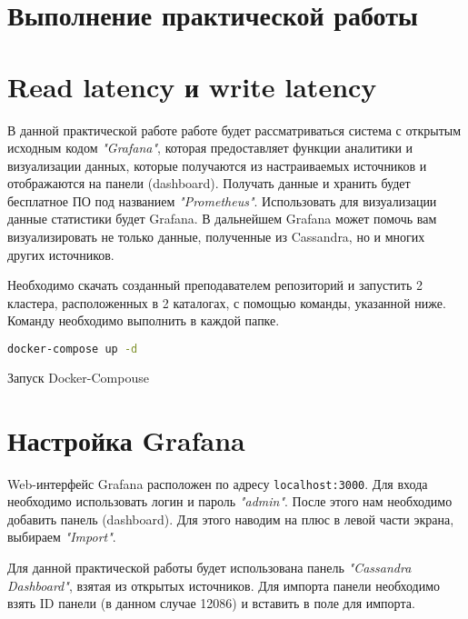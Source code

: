 \section*{\LARGE Выполнение практической работы}

\section{Read latency и write latency}

В данной практической работе работе будет рассматриваться система с
открытым исходным кодом \textit{"Grafana"}, которая предоставляет функции
аналитики и визуализации данных, которые получаются из настраиваемых
источников и отображаются на панели (dashboard). Получать данные и хранить
будет бесплатное ПО под названием \textit{"Prometheus"}. Использовать для
визуализации данные статистики будет Grafana. В дальнейшем Grafana может
помочь вам визуализировать не только данные, полученные из Cassandra, но и
многих других источников.\par
Необходимо скачать созданный преподавателем репозиторий
и запустить 2 кластера, расположенных в 2 каталогах, с
помощью команды, указанной ниже. Команду необходимо выполнить в каждой
папке.

\begin{lstlisting}[language=bash]
docker-compose up -d
\end{lstlisting}

\begin{image}
	\caption{Запуск Docker-Compouse}
	\label{fig:docker:compouse}
\end{image}

\section{Настройка Grafana}

Web-интерфейс Grafana расположен по адресу \texttt{localhost:3000}.
Для входа необходимо использовать логин и пароль \textit{"admin"}.
После этого нам необходимо добавить панель (dashboard).
Для этого наводим на плюс в левой части экрана, выбираем \textit{"Import"}.\par
Для данной практической работы будет использована панель
\textit{"Cassandra Dashboard"}, взятая из открытых источников.
Для импорта панели необходимо взять ID панели (в данном случае 12086)
и вставить в поле для импорта.

